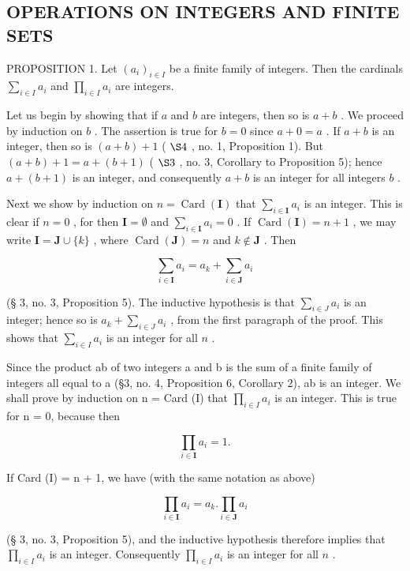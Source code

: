 \subsection{OPERATIONS ON INTEGERS AND FINITE SETS}

PROPOSITION 1. Let \((a_i)_{i\in I}\) be a finite family of integers. Then the cardinals \(\sum_{i\in I}a_i\) and \(\prod_{i\in I}a_i\) are integers.

Let us begin by showing that if \(a\) and \(b\) are integers, then so is \(a + b\) . We proceed by induction on \(b\) . The assertion is true for \(b = 0\) since \(a + 0 = a\) . If \(a + b\) is an integer, then so is \((a + b) + 1\) ( \(\S 4\) , no. 1, Proposition 1). But \((a + b) + 1 = a + (b + 1)\) ( \(\S 3\) , no. 3, Corollary to Proposition 5); hence \(a + (b + 1)\) is an integer, and consequently \(a + b\) is an integer for all integers \(b\) .

Next we show by induction on \(n = \operatorname{Card}(\mathbf{I})\) that \(\sum_{i \in \mathbf{I}} a_i\) is an integer. This is clear if \(n = 0\) , for then \(\mathbf{I} = \emptyset\) and \(\sum_{i \in \mathbf{I}} a_i = 0\) . If \(\operatorname{Card}(\mathbf{I}) = n + 1\) , we may write \(\mathbf{I} = \mathbf{J} \cup \{k\}\) , where \(\operatorname{Card}(\mathbf{J}) = n\) and \(k \notin \mathbf{J}\) . Then

\[
\sum_ {i \in \mathbf {I}} a _ {i} = a _ {k} + \sum_ {i \in \mathbf {J}} a _ {i}
\]

(§ 3, no. 3, Proposition 5). The inductive hypothesis is that \(\sum_{i\in J}a_i\) is an integer; hence so is \(a_{k} + \sum_{i\in J}a_{i}\) , from the first paragraph of the proof. This shows that \(\sum_{i\in I}a_{i}\) is an integer for all \(n\) .

Since the product ab of two integers a and b is the sum of a finite family of integers all equal to a (§3, no. 4, Proposition 6, Corollary 2), ab is an integer. We shall prove by induction on n = Card (I) that \(\prod_{i\in I}a_{i}\) is an integer. This is true for n = 0, because then

\[
\prod_ {i \in \mathbf {I}} a _ {i} = 1.
\]

If Card (I) = n + 1, we have (with the same notation as above)

\[
\prod_ {i \in \mathbf {I}} a _ {i} = a _ {k}. \prod_ {i \in \mathbf {J}} a _ {i}
\]

(§ 3, no. 3, Proposition 5), and the inductive hypothesis therefore implies that \(\prod_{i\in I}a_i\) is an integer. Consequently \(\prod_{i\in I}a_i\) is an integer for all \(n\) .

